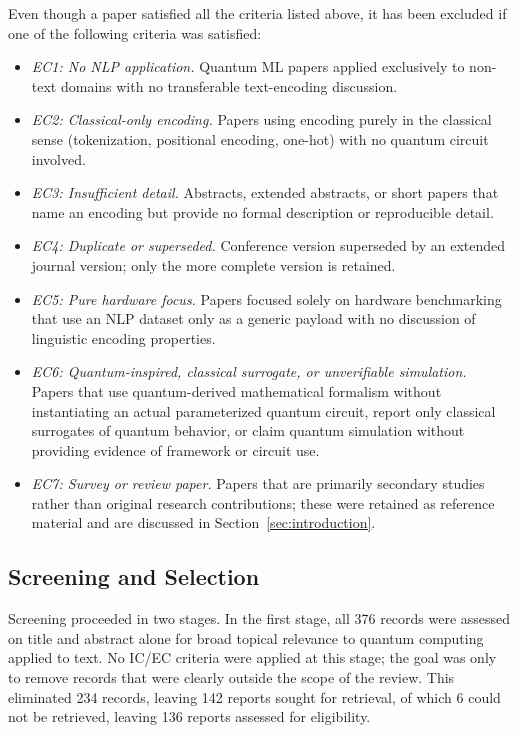 \documentclass{ieeeaccess}
\begin{document}
Even though a paper satisfied all the criteria listed above, it has been excluded if one of the following criteria was satisfied: 
\begin{itemize}
    \item \textit{EC1: No NLP application.} Quantum ML papers applied exclusively to non-text domains with no transferable text-encoding discussion.

    \item \textit{EC2: Classical-only encoding.} Papers using encoding purely in the classical sense (tokenization, positional encoding, one-hot) with no quantum circuit involved.

    \item \textit{EC3: Insufficient detail.} Abstracts, extended abstracts, or short papers that name an encoding but provide no formal description or reproducible detail.

    \item \textit{EC4: Duplicate or superseded.} Conference version superseded by an extended journal version; only the more complete version is retained.

    \item \textit{EC5: Pure hardware focus.} Papers focused solely on hardware benchmarking that use an NLP dataset only as a generic payload with no discussion of linguistic encoding properties.

    \item \textit{EC6: Quantum-inspired, classical surrogate, or unverifiable simulation.} Papers that use quantum-derived mathematical formalism without instantiating an actual parameterized quantum circuit, report only classical surrogates of quantum behavior, or claim quantum simulation without providing evidence of framework or circuit use.

    \item \textit{EC7: Survey or review paper.} Papers that are primarily secondary studies rather than original research contributions; these were retained as reference material and are discussed in Section~\ref{sec:introduction}.
\end{itemize}

\subsection{Screening and Selection}
\label{sec:screening}

Screening proceeded in two stages. In the first stage, all 376 records were assessed on title and abstract alone for broad topical relevance to quantum computing applied to text. No IC/EC criteria were applied at this stage; the goal was only to remove records that were clearly outside the scope of the review. This eliminated 234 records, leaving 142 reports sought for retrieval, of which 6 could not be retrieved, leaving 136 reports assessed for eligibility.
\end{document}
